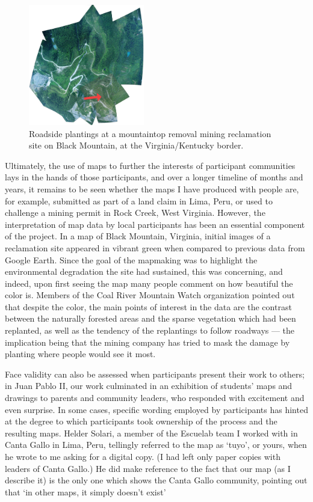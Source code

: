 \documentclass[11pt,oneside,notitlepage]{report}
\begin{document}
{{\begin{figure}
  \begin{flushright}
	\includegraphics[width=0.45\textwidth]{images/black-mountain.jpg}
	\caption{Roadside plantings at a mountaintop removal mining reclamation site on Black Mountain, at the Virginia/Kentucky border.}
  \end{flushright}
\end{figure}

Ultimately, the use of maps to further the interests of participant communities lays in the hands of those participants, and over a longer timeline of months and years, it remains to be seen whether the maps I have produced with people are, for example, submitted as part of a land claim in Lima, Peru, or used to challenge a mining permit in Rock Creek, West Virginia. However, the interpretation of map data by local participants has been an essential component of the project. In a map of Black Mountain, Virginia, initial images of a reclamation site appeared in vibrant green when compared to previous data from Google Earth. Since the goal of the mapmaking was to highlight the environmental degradation the site had sustained, this was concerning, and indeed, upon first seeing the map many people comment on how beautiful the color is. Members of the Coal River Mountain Watch organization pointed out that despite the color, the main points of interest in the data are the contrast between the naturally forested areas and the sparse vegetation which had been replanted, as well as the tendency of the replantings to follow roadways --- the implication being that the mining company has tried to mask the damage by planting where people would see it most.  

Face validity can also be assessed when participants present their work to others; in Juan Pablo II, our work culminated in an exhibition of students' maps and drawings to parents and community leaders, who responded with excitement and even surprise. In some cases, specific wording employed by participants has hinted at the degree to which participants took ownership of the process and the resulting maps. Helder Solari, a member of the Escuelab team I worked with in Canta Gallo in Lima, Peru, tellingly referred to the map as `tuyo', or yours, when he wrote to me asking for a digital copy. (I had left only paper copies with leaders of Canta Gallo.) He did make reference to the fact that our map (as I describe it) is the only one which shows the Canta Gallo community, pointing out that `in other maps, it simply doesn't exist' \cite{solari2010cantagallo}

}}
\end{document}
